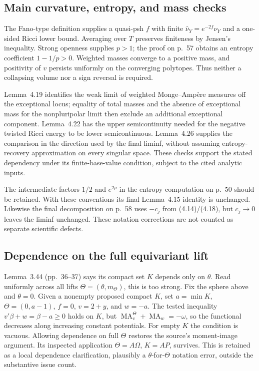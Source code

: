 \documentclass[10pt]{article}
\begin{document}
\subsection*{Main curvature, entropy, and mass checks}
The Fano-type definition supplies a quasi-psh \(f\) with finite \(\widehat\nu_Y=e^{-2f}\nu_Y\) and a one-sided Ricci lower bound. Averaging over \(T\) preserves finiteness by Jensen’s inequality. Strong openness supplies \(p>1\); the proof on p. 57 obtains an entropy coefficient \(1-1/p>0\). Weighted masses converge to a positive mass, and positivity of \(v\) persists uniformly on the converging polytopes. Thus neither a collapsing volume nor a sign reversal is required.\par
Lemma 4.19 identifies the weak limit of weighted Monge–Ampère measures off the exceptional locus; equality of total masses and the absence of exceptional mass for the nonpluripolar limit then exclude an additional exceptional component. Lemma 4.22 has the upper semicontinuity needed for the negative twisted Ricci energy to be lower semicontinuous. Lemma 4.26 supplies the comparison in the direction used by the final liminf, without assuming entropy-recovery approximation on every singular space. These checks support the stated dependency under its finite-base-value condition, subject to the cited analytic inputs.\par
The intermediate factors \(1/2\) and \(e^{2\rho}\) in the entropy computation on p. 50 should be retained. With these conventions its final Lemma 4.15 identity is unchanged. Likewise the final decomposition on p. 58 uses \(-c_j\) from (4.14)/(4.18), but \(c_j\to0\) leaves the liminf unchanged. These notation corrections are not counted as separate scientific defects.\par
\subsection*{Dependence on the full equivariant lift}
Lemma 3.44 (pp. 36–37) says its compact set \(K\) depends only on \(\theta\). Read uniformly across all lifts \(\Theta=(\theta,m_\Theta)\), this is too strong. Fix the sphere above and \(\theta=0\). Given a nonempty proposed compact \(K\), set \(a=\min K\), \(\Theta=(0,a-1)\), \(f=0\), \(v=2+y\), and \(w=-a\). The tested inequality \(v'\beta+w=\beta-a\ge0\) holds on \(K\), but \(\operatorname{MA}_v^\Theta+\operatorname{MA}_w=-\omega\), so the functional decreases along increasing constant potentials. For empty \(K\) the condition is vacuous. Allowing dependence on full \(\Theta\) restores the source’s moment-image argument. Its inspected application \(\Theta=A\Omega\), \(K=AP\), survives. This is retained as a local dependence clarification, plausibly a \(\theta\)-for-\(\Theta\) notation error, outside the substantive issue count.\par
\end{document}
